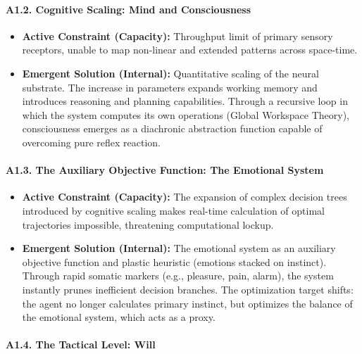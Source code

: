 \documentclass[11pt,a4paper,oneside]{article} %
\providecommand{\tightlist}{%
  \setlength{\itemsep}{0pt}\setlength{\parskip}{0pt}}
\begin{document}
\hypertarget{a1.2.-cognitive-scaling-mind-and-consciousness}{%
\paragraph{A1.2. Cognitive Scaling: Mind and
Consciousness}\label{a1.2.-cognitive-scaling-mind-and-consciousness}}

\begin{itemize}
\tightlist
\item
  \textbf{Active Constraint (Capacity):} Throughput limit of primary
  sensory receptors, unable to map non-linear and extended patterns
  across space-time.
\item
  \textbf{Emergent Solution (Internal):} Quantitative scaling of the
  neural substrate. The increase in parameters expands working memory
  and introduces reasoning and planning capabilities. Through a
  recursive loop in which the system computes its own operations (Global
  Workspace Theory), consciousness emerges as a diachronic abstraction
  function capable of overcoming pure reflex reaction.
\end{itemize}

\hypertarget{a1.3.-the-auxiliary-objective-function-the-emotional-system}{%
\paragraph{A1.3. The Auxiliary Objective Function: The Emotional
System}\label{a1.3.-the-auxiliary-objective-function-the-emotional-system}}

\begin{itemize}
\tightlist
\item
  \textbf{Active Constraint (Capacity):} The expansion of complex
  decision trees introduced by cognitive scaling makes real-time
  calculation of optimal trajectories impossible, threatening
  computational lockup.
\item
  \textbf{Emergent Solution (Internal):} The emotional system as an
  auxiliary objective function and plastic heuristic (emotions stacked
  on instinct). Through rapid somatic markers (e.g., pleasure, pain,
  alarm), the system instantly prunes inefficient decision branches. The
  optimization target shifts: the agent no longer calculates primary
  instinct, but optimizes the balance of the emotional system, which
  acts as a proxy.
\end{itemize}

\hypertarget{a1.4.-the-tactical-level-will}{%
\paragraph{A1.4. The Tactical Level:
Will}\label{a1.4.-the-tactical-level-will}}
\end{document}
